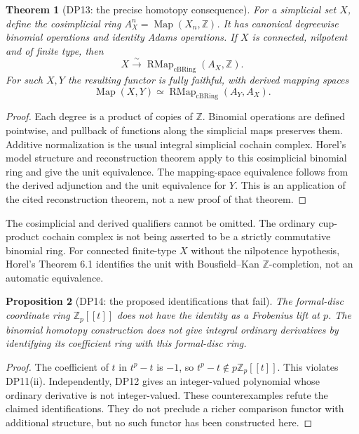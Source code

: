 \documentclass[11pt,a4paper]{article}
\newtheorem{theorem}{Theorem}[section]
\newtheorem{proposition}[theorem]{Proposition}
\theoremstyle{definition}\newtheorem{remark}[theorem]{Remark}
\newcommand{\Z}{\mathbb Z}\newcommand{\Q}{\mathbb Q}\newcommand{\F}{\mathbb F}
\newcommand{\RMap}{\operatorname{RMap}}\newcommand{\Int}{\operatorname{Int}}
\begin{document}
\begin{theorem}[DP13: the precise homotopy consequence]\label{DP13}
For a simplicial set $X$, define the cosimplicial ring $A_X^n=\operatorname{Map}(X_n,\Z)$. It has canonical degreewise binomial operations and identity Adams operations. If $X$ is connected, nilpotent and of finite type, then
\[
 X\xrightarrow{\sim}\RMap_{\mathrm{cBRing}}(A_X,\Z).
\]
For such $X,Y$ the resulting functor is fully faithful, with derived mapping spaces
\[
 \operatorname{Map}(X,Y)\simeq\RMap_{\mathrm{cBRing}}(A_Y,A_X).
\]
\end{theorem}
\begin{proof}
Each degree is a product of copies of $\Z$. Binomial operations are defined pointwise, and pullback of functions along the simplicial maps preserves them. Additive normalization is the usual integral simplicial cochain complex. Horel's model structure and reconstruction theorem \cite[Theorems 3.7 and 5.4]{Horel} apply to this cosimplicial binomial ring and give the unit equivalence. The mapping-space equivalence follows from the derived adjunction and the unit equivalence for $Y$. This is an application of the cited reconstruction theorem, not a new proof of that theorem.
\end{proof}

The cosimplicial and derived qualifiers cannot be omitted. The ordinary cup-product cochain complex is not being asserted to be a strictly commutative binomial ring. For connected finite-type $X$ without the nilpotence hypothesis, Horel's Theorem 6.1 identifies the unit with Bousfield--Kan $\Z$-completion, not an automatic equivalence.

\begin{proposition}[DP14: the proposed identifications that fail]\label{DP14}
The formal-disc coordinate ring $\Z_p[[t]]$ does not have the identity as a Frobenius lift at $p$. The binomial homotopy construction does not give integral ordinary derivatives by identifying its coefficient ring with this formal-disc ring.
\end{proposition}
\begin{proof}
The coefficient of $t$ in $t^p-t$ is $-1$, so $t^p-t\notin p\Z_p[[t]]$. This violates DP11(ii). Independently, DP12 gives an integer-valued polynomial whose ordinary derivative is not integer-valued. These counterexamples refute the claimed identifications. They do not preclude a richer comparison functor with additional structure, but no such functor has been constructed here.
\end{proof}
\end{document}
